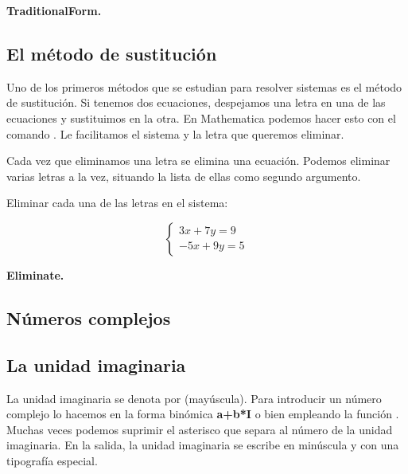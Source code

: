 \documentclass[a4paper,10pt, draft]{article}
\newcommand{\com}[1]{\textbf{\color{blue}{#1}}}
\newenvironment{capitulo}{\begin{tcolorbox}[colback=red!5!white,colframe=red!75!black]}{\end{tcolorbox}\bigskip}
\newenvironment{ejer}{\begin{tcolorbox}[center title, title=Ejercicios,
fonttitle=\sffamily\bfseries,colback=blue!5,colframe=orange]}{\end{tcolorbox}}
\newenvironment{funciones}{\begin{tcolorbox}[center title, title=Nuevas funciones, fonttitle=\sffamily\bfseries, colback=green!5!white,colframe=red!75!black]}{\end{tcolorbox}\bigskip}
\begin{document}
\begin{funciones}

\textbf{TraditionalForm.}

\end{funciones}


 \newpage


\subsection{El método de sustitución}

Uno de los primeros métodos que se estudian para resolver sistemas es el método de sustitución. Si tenemos dos ecuaciones, despejamos una letra en una de las ecuaciones y sustituimos en la otra. En Mathematica podemos hacer esto con el comando \com{Eliminate[p==q,x]}. Le facilitamos el sistema y la letra que queremos eliminar.

Cada vez que eliminamos una letra se elimina una ecuación. Podemos eliminar varias letras a la vez, situando la lista de ellas como segundo argumento.

\begin{ejer}

Eliminar cada una de las letras en el sistema:

$$
\begin{cases}
3x+7y=9\\
-5x+9y=5
\end{cases}
$$

\end{ejer}  

\begin{funciones}


\textbf{Eliminate.}

\end{funciones}


\newpage

\begin{capitulo}

\section{Números complejos}


\end{capitulo}



\subsection{La unidad imaginaria}
La unidad imaginaria se denota por \com{I} (mayúscula). Para introducir un número complejo lo hacemos en la forma binómica \textbf{a+b*I} o bien empleando la función \com{Complex[a,b]}. Muchas veces podemos suprimir el asterisco que separa al número de la unidad imaginaria. En la salida, la unidad imaginaria se escribe en minúscula y con una tipografía especial.
\end{document}
